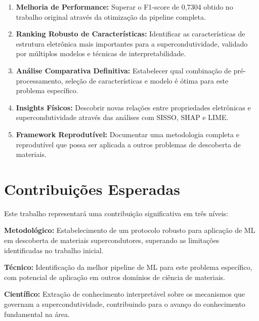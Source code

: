 \documentclass[12pt, a4paper]{article}
\begin{document}
\begin{enumerate}
    \item \textbf{Melhoria de Performance:} Superar o F1-score de 0,7304 obtido no trabalho original através da otimização da pipeline completa.
    \item \textbf{Ranking Robusto de Características:} Identificar as características de estrutura eletrônica mais importantes para a supercondutividade, validado por múltiplos modelos e técnicas de interpretabilidade.
    \item \textbf{Análise Comparativa Definitiva:} Estabelecer qual combinação de pré-processamento, seleção de características e modelo é ótima para este problema específico.
    \item \textbf{Insights Físicos:} Descobrir novas relações entre propriedades eletrônicas e supercondutividade através das análises com SISSO, SHAP e LIME.
    \item \textbf{Framework Reprodutível:} Documentar uma metodologia completa e reprodutível que possa ser aplicada a outros problemas de descoberta de materiais.
\end{enumerate}

\section{Contribuições Esperadas}

Este trabalho representará uma contribuição significativa em três níveis:

\textbf{Metodológico:} Estabelecimento de um protocolo robusto para aplicação de ML em descoberta de materiais supercondutores, superando as limitações identificadas no trabalho inicial.

\textbf{Técnico:} Identificação da melhor pipeline de ML para este problema específico, com potencial de aplicação em outros domínios de ciência de materiais.

\textbf{Científico:} Extração de conhecimento interpretável sobre os mecanismos que governam a supercondutividade, contribuindo para o avanço do conhecimento fundamental na área.
\end{document}
